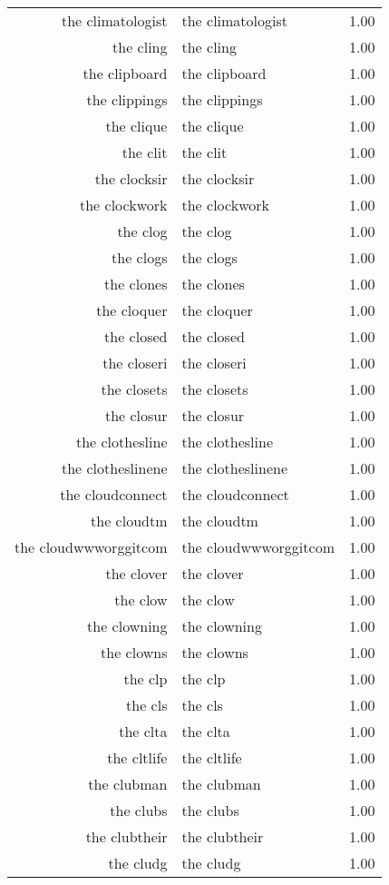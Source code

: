 \begin{table}[ht]
\begin{tabular}{rlr}
  the climatologist & the climatologist & 1.00 \\ 
  the cling & the cling & 1.00 \\ 
  the clipboard & the clipboard & 1.00 \\ 
  the clippings & the clippings & 1.00 \\ 
  the clique & the clique & 1.00 \\ 
  the clit & the clit & 1.00 \\ 
  the clocksir & the clocksir & 1.00 \\ 
  the clockwork & the clockwork & 1.00 \\ 
  the clog & the clog & 1.00 \\ 
  the clogs & the clogs & 1.00 \\ 
  the clones & the clones & 1.00 \\ 
  the cloquer & the cloquer & 1.00 \\ 
  the closed & the closed & 1.00 \\ 
  the closeri & the closeri & 1.00 \\ 
  the closets & the closets & 1.00 \\ 
  the closur & the closur & 1.00 \\ 
  the clothesline & the clothesline & 1.00 \\ 
  the clotheslinene & the clotheslinene & 1.00 \\ 
  the cloudconnect & the cloudconnect & 1.00 \\ 
  the cloudtm & the cloudtm & 1.00 \\ 
  the cloudwwworggitcom & the cloudwwworggitcom & 1.00 \\ 
  the clover & the clover & 1.00 \\ 
  the clow & the clow & 1.00 \\ 
  the clowning & the clowning & 1.00 \\ 
  the clowns & the clowns & 1.00 \\ 
  the clp & the clp & 1.00 \\ 
  the cls & the cls & 1.00 \\ 
  the clta & the clta & 1.00 \\ 
  the cltlife & the cltlife & 1.00 \\ 
  the clubman & the clubman & 1.00 \\ 
  the clubs & the clubs & 1.00 \\ 
  the clubtheir & the clubtheir & 1.00 \\ 
  the cludg & the cludg & 1.00 \\ 

\end{tabular}
\end{table}
